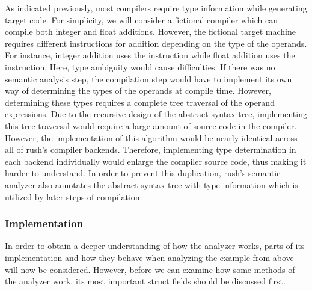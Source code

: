 As indicated previously, most compilers require type information while
generating target code. For simplicity, we will consider a fictional compiler
which can compile both integer and float additions. However, the fictional
target machine requires different instructions for addition depending on the
type of the operands. For instance, integer addition uses the  instruction
while float addition uses the  instruction. Here, type ambiguity would
cause difficulties. If there was no semantic analysis step, the compilation step would
have to implement its own way of determining the types of the operands at
compile time. However, determining these types requires a complete
tree traversal of the operand expressions. Due to the recursive design of the
abstract syntax tree, implementing this tree traversal would require a large amount of source code in the compiler.
However, the implementation of this algorithm would be nearly identical across all of rush's compiler
backends. Therefore, implementing type determination in each backend
individually would enlarge the compiler source code, thus making it harder to
understand. In order to prevent this duplication, rush's semantic analyzer also annotates the abstract syntax tree with type
information which is utilized by later steps of compilation.

\subsubsection{Implementation}

In order to obtain a deeper understanding of how the analyzer works, parts of its implementation and how they behave when analyzing the
example from above will now be considered. However, before we can examine how some methods of the analyzer work,
its most important struct fields should be discussed first.



